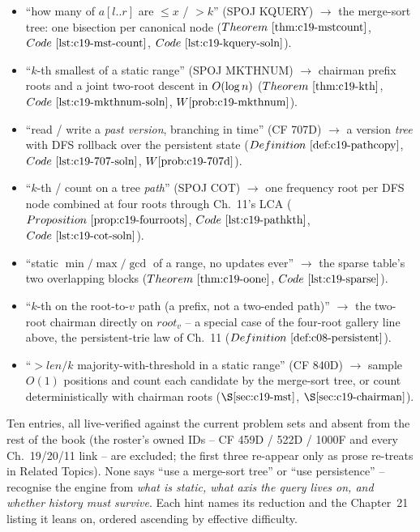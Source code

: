 \begin{itemize}[nosep, leftmargin=1.4em]
  \item ``how many of \(a[l..r]\) are \(\le x\) / \(>k\)'' (SPOJ KQUERY) \(\to\) the
        merge-sort tree: one bisection per canonical node
        (\(\thmref{c19-mstcount}\), \(\coderef{c19-mst-count}\), \(\coderef{c19-kquery-soln}\)).
  \item ``\(k\)-th smallest of a static range'' (SPOJ MKTHNUM) \(\to\) chairman prefix roots
        and a joint two-root descent in \(O(\log n)\)
        (\(\thmref{c19-kth}\), \(\coderef{c19-mkthnum-soln}\), \(\probref{c19-mkthnum}\)).
  \item ``read / write a \emph{past version}, branching in time'' (CF 707D) \(\to\) a version
        \emph{tree} with DFS rollback over the persistent state
        (\(\defref{c19-pathcopy}\), \(\coderef{c19-707-soln}\), \(\probref{c19-707d}\)).
  \item ``\(k\)-th / count on a tree \emph{path}'' (SPOJ COT) \(\to\) one frequency root per
        DFS node combined at four roots through Ch.~11's LCA
        (\(\propref{c19-fourroots}\), \(\coderef{c19-pathkth}\), \(\coderef{c19-cot-soln}\)).
  \item ``static \(\min/\max/\gcd\) of a range, no updates ever'' \(\to\) the sparse table's
        two overlapping blocks (\(\thmref{c19-oone}\), \(\coderef{c19-sparse}\)).
  \item ``\(k\)-th on the root-to-\(v\) path (a prefix, not a two-ended path)'' \(\to\) the
        two-root chairman directly on \(\mathit{root}_v\) -- a special case of the four-root
        gallery line above, the persistent-trie law of Ch.~11 (\(\defref{c08-persistent}\)).
  \item ``\(>\!\mathit{len}/k\) majority-with-threshold in a static range'' (CF 840D) \(\to\)
        sample \(O(1)\) positions and count each candidate by the merge-sort tree, or count
        deterministically with chairman roots (\(\secref{c19-mst}\), \(\secref{c19-chairman}\)).
\end{itemize}



Ten entries, all live-verified against the current problem sets and absent from the rest of
the book (the roster's owned IDs -- CF 459D / 522D / 1000F and every Ch.~19/20/11 link -- are
excluded; the first three re-appear only as prose re-treats in Related Topics). None says
``use a merge-sort tree'' or ``use persistence'' -- recognise the engine from \emph{what is
static, what axis the query lives on, and whether history must survive}. Each hint names its
reduction and the Chapter~21 listing it leans on, ordered ascending by effective difficulty.

